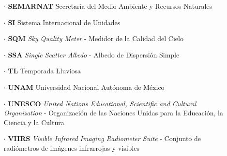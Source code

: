 \begin{itemize}
\item[$\cdot$] \textbf{SEMARNAT} Secretaría del Medio Ambiente y Recursos Naturales

\item[$\cdot$] \textbf{SI} Sistema Internacional de Unidades

\item[$\cdot$] \textbf{SQM} \textit{Sky Quality Meter} - Medidor de la Calidad del Cielo

\item[$\cdot$] \textbf{SSA} \textit{Single Scatter Albedo} - Albedo de Dispersión Simple

\item[$\cdot$] \textbf{TL} Temporada Lluviosa

\item[$\cdot$] \textbf{UNAM} Universidad Nacional Autónoma de México

\item[$\cdot$] \textbf{UNESCO} \textit{United Nations Educational, Scientific and Cultural Organization} - Organización de las Naciones Unidas para la Educación, la Ciencia y la Cultura

\item[$\cdot$] \textbf{VIIRS} \textit{Visible Infrared Imaging Radiometer Suite} - Conjunto de radiómetros de imágenes infrarrojas y visibles
			
\end{itemize}